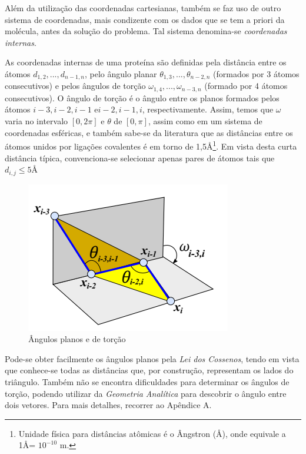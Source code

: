 \documentclass[a4paper,12pt]{article}
\begin{document}
	Além da utilização das coordenadas cartesianas, também se faz uso de outro sistema de coordenadas, mais condizente com os dados que se tem a priori da molécula, antes da solução do problema. Tal sistema denomina-se \textit{coordenadas internas}.
	
	As coordenadas internas de uma proteína são definidas pela distância entre os átomos $d_{1,2}, ..., d_{n - 1,n}$, pelo ângulo planar $\theta_{1,3}, ...,\theta_{n - 2,n}$ (formados por 3 átomos consecutivos) e pelos ângulos de torção $\omega_{1,4}, ..., \omega_{n-3,n}$ (formado por 4 átomos consecutivos). O ângulo de torção é o ângulo entre os planos formados pelos átomos $i-3,i-2,i-1$ e$i-2,i-1,i$, respectivamente. Assim, temos que $\omega$ varia no intervalo $[0,2\pi]$ e $\theta$ de $[0,\pi]$, assim como em um sistema de coordenadas esféricas, e também sabe-se da literatura que as distâncias entre os átomos unidos por ligações covalentes é em torno de 1,5\AA\footnote[1]{Unidade física para distâncias atômicas é o Ângstron (\AA), onde equivale a 1\AA = $10^{-10}$ m.}. Em vista desta curta distância típica, convenciona-se selecionar apenas pares de átomos tais que $d_{i,j}\leq 5 $\AA 
	\\
	
	\begin{figure}[H]
		\begin{center}
			\includegraphics[width=0.6\linewidth]{Capturar.PNG}
		\end{center}
		\caption{Ângulos planos e de torção}
		\label{fig:angulos}
	\end{figure}
	
	Pode-se obter facilmente os ângulos planos pela \textit{Lei dos Cossenos}, tendo em vista que conhece-se todas as distâncias que, por construção, representam os lados do triângulo. Também não se encontra dificuldades para determinar os ângulos de torção, podendo utilizar da \textit{Geometria Analítica} para descobrir o ângulo entre dois vetores. Para mais detalhes, recorrer ao Apêndice A.
	
\end{document}
